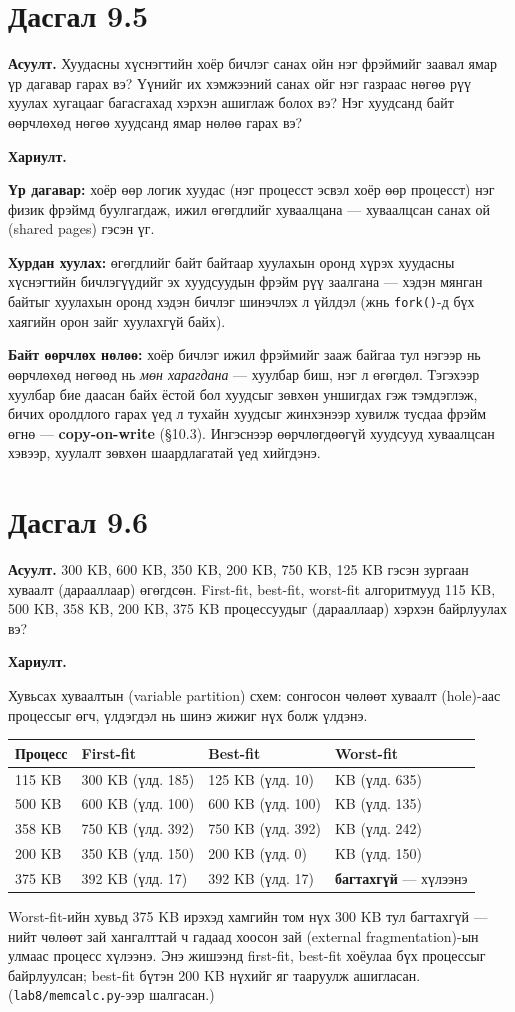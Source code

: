 \documentclass[12pt,a4paper]{article}
\newcommand{\question}[2]{\section{Дасгал #1}\textbf{Асуулт.} #2\par\medskip\textbf{Хариулт.}\par}
\begin{document}
\question{9.5}{Хуудасны хүснэгтийн хоёр бичлэг санах ойн нэг фрэймийг заавал ямар үр дагавар гарах вэ? Үүнийг их хэмжээний санах ойг нэг газраас нөгөө рүү хуулах хугацааг багасгахад хэрхэн ашиглаж болох вэ? Нэг хуудсанд байт өөрчлөхөд нөгөө хуудсанд ямар нөлөө гарах вэ?}

\textbf{Үр дагавар:} хоёр өөр логик хуудас (нэг процесст эсвэл хоёр өөр процесст) нэг физик фрэймд буулгагдаж, ижил өгөгдлийг хуваалцана — хуваалцсан санах ой (shared pages) гэсэн үг.

\textbf{Хурдан хуулах:} өгөгдлийг байт байтаар хуулахын оронд хүрэх хуудасны хүснэгтийн бичлэгүүдийг эх хуудсуудын фрэйм рүү заалгана — хэдэн мянган байтыг хуулахын оронд хэдэн бичлэг шинэчлэх л үйлдэл (жнь \texttt{fork()}-д бүх хаягийн орон зайг хуулахгүй байх).

\textbf{Байт өөрчлөх нөлөө:} хоёр бичлэг ижил фрэймийг зааж байгаа тул нэгээр нь өөрчлөхөд нөгөөд нь \emph{мөн харагдана} — хуулбар биш, нэг л өгөгдөл. Тэгэхээр хуулбар бие даасан байх ёстой бол хуудсыг зөвхөн уншигдах гэж тэмдэглэж, бичих оролдлого гарах үед л тухайн хуудсыг жинхэнээр хувилж тусдаа фрэйм өгнө — \textbf{copy-on-write} (§10.3). Ингэснээр өөрчлөгдөөгүй хуудсууд хуваалцсан хэвээр, хуулалт зөвхөн шаардлагатай үед хийгдэнэ.

\question{9.6}{300 KB, 600 KB, 350 KB, 200 KB, 750 KB, 125 KB гэсэн зургаан хуваалт (дарааллаар) өгөгдсөн. First-fit, best-fit, worst-fit алгоритмууд 115 KB, 500 KB, 358 KB, 200 KB, 375 KB процессуудыг (дарааллаар) хэрхэн байрлуулах вэ?}

Хувьсах хуваалтын (variable partition) схем: сонгосон чөлөөт хуваалт (hole)-аас процессыг өгч, үлдэгдэл нь шинэ жижиг нүх болж үлдэнэ.
\begin{center}
\begin{tabular}{l>{\raggedright}p{3.6cm}>{\raggedright}p{3.6cm}>{\raggedright\arraybackslash}p{3.6cm}}
\toprule
Процесс & First-fit & Best-fit & Worst-fit\\
\midrule
115 KB & 300 KB (үлд. 185) & 125 KB (үлд. 10) & 750 KB (үлд. 635)\\
500 KB & 600 KB (үлд. 100) & 600 KB (үлд. 100) & 635 KB (үлд. 135)\\
358 KB & 750 KB (үлд. 392) & 750 KB (үлд. 392) & 600 KB (үлд. 242)\\
200 KB & 350 KB (үлд. 150) & 200 KB (үлд. 0) & 350 KB (үлд. 150)\\
375 KB & 392 KB (үлд. 17) & 392 KB (үлд. 17) & \textbf{багтахгүй} — хүлээнэ\\
\bottomrule
\end{tabular}
\end{center}
Worst-fit-ийн хувьд 375 KB ирэхэд хамгийн том нүх 300 KB тул багтахгүй — нийт чөлөөт зай хангалттай ч гадаад хоосон зай (external fragmentation)-ын улмаас процесс хүлээнэ. Энэ жишээнд first-fit, best-fit хоёулаа бүх процессыг байрлуулсан; best-fit бүтэн 200 KB нүхийг яг тааруулж ашигласан. (\texttt{lab8/memcalc.py}-ээр шалгасан.)
\end{document}
